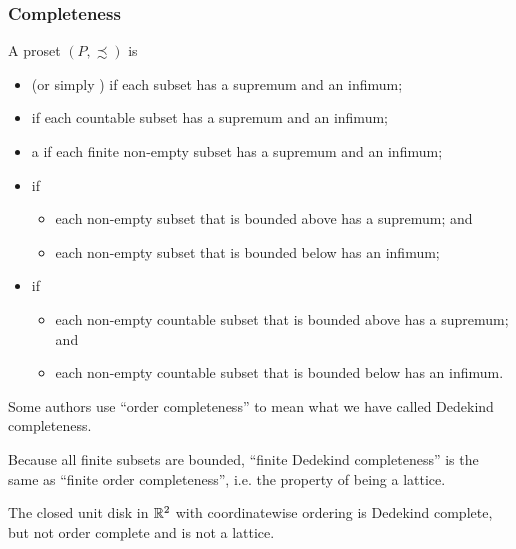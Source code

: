 \subsubsection{Completeness}
\begin{definition}
A proset $(P,\precsim)$ is 
\begin{itemize}
\item {} (or simply ) if each subset has a supremum and an infimum;
\item {} if each countable subset has a supremum and an infimum;
\item a  if each finite non-empty subset has a supremum and an infimum;
\item {} if
\begin{itemize}
\item each non-empty subset that is bounded above has a supremum; and
\item each non-empty subset that is bounded below has an infimum;
\end{itemize}
\item {} if
\begin{itemize}
\item each non-empty countable subset that is bounded above has a supremum; and
\item each non-empty countable subset that is bounded below has an infimum.
\end{itemize}
\end{itemize}
\end{definition}
Some authors use ``order completeness'' to mean what we have called Dedekind completeness.

Because all finite subsets are bounded, ``finite Dedekind completeness'' is the same as ``finite order completeness'', i.e. the property of being a lattice.

\begin{example}
The closed unit disk in $\mathbb{R}^2$ with coordinatewise ordering is Dedekind complete, but not order complete and is not a lattice.
\end{example}

